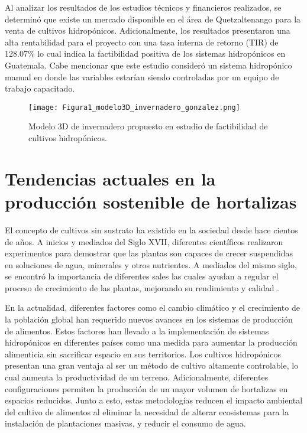 Al analizar los resultados de los estudios técnicos y financieros realizados, se determinó que existe un mercado disponible en el área de Quetzaltenango para la venta de cultivos hidropónicos. Adicionalmente, los resultados presentaron una alta rentabilidad para el proyecto con una tasa interna de retorno (TIR) de 128.07\% lo cual indica la factibilidad positiva de los sistemas hidropónicos en Guatemala. Cabe mencionar que este estudio consideró un sistema hidropónico manual en donde las variables estarían siendo controladas por un equipo de trabajo capacitado.

\begin{figure}[H]
	\centering
	\texttt{[image: Figura1\_modelo3D\_invernadero\_gonzalez.png]}
	\caption{Modelo 3D de invernadero propuesto en estudio de factibilidad de cultivos hidropónicos.}
	\label{fig:mesh1}
\end{figure}

\section{Tendencias actuales en la producción sostenible de hortalizas}
El concepto de cultivos sin sustrato ha existido en la sociedad desde hace cientos de años. A inicios y mediados del Siglo XVII, diferentes científicos realizaron experimentos para demostrar que las plantas son capaces de crecer suspendidas en soluciones de agua, minerales y otros nutrientes. A mediados del mismo siglo, se encontró la importancia de diferentes sales las cuales ayudan a regular el proceso de crecimiento de las plantas, mejorando su rendimiento y calidad \cite{rajaseger_hydroponics_2023}. 

En la actualidad, diferentes factores como el cambio climático y el crecimiento de la población global han requerido nuevos avances en los sistemas de producción de alimentos. Estos factores han llevado a la implementación de sistemas hidropónicos en diferentes países como una medida para aumentar la producción alimenticia sin sacrificar espacio en sus territorios. Los cultivos hidropónicos presentan una gran ventaja al ser un método de cultivo altamente controlable, lo cual aumenta la productividad de un terreno. Adicionalmente, diferentes configuraciones permiten la producción de un mayor volumen de hortalizas en espacios reducidos. Junto a esto, estas metodologías reducen el impacto ambiental del cultivo de alimentos al eliminar la necesidad de alterar ecosistemas para la instalación de plantaciones masivas, y reducir el consumo de agua.

